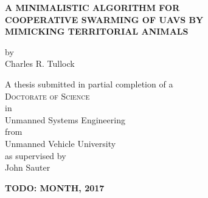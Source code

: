 
\begin{titlepage}
	\begin{center}

		\vspace*{1cm}
		 
		\large{ \textbf{ \uppercase{A minimalistic algorithm for\\cooperative swarming of UAVs by\\mimicking territorial animals}}}
		
		
		\vspace{1.5cm}
		
		by\\
		Charles R. Tullock\\
		
		\vspace{1.5cm}
		
		A thesis submitted in partial completion of a\\
		\large{\textsc{Doctorate of Science}}\\ 
		in\\
		\large{Unmanned Systems Engineering}\\
		from\\
		\large{Unmanned Vehicle University}\\
		as supervised by\\
		\large{John Sauter}
		
		\vspace{2cm}
		\textbf{TODO: MONTH, 2017}
		
		\vfill

	\end{center}
\thispagestyle{empty}
\end{titlepage}

